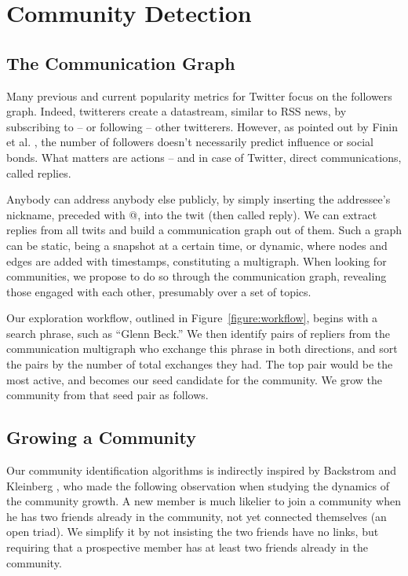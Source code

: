 \section{Community Detection}

\subsection{The Communication Graph}

Many previous and current popularity metrics for Twitter focus on the followers graph.  Indeed, twitterers create a datastream, similar to RSS news, by subscribing to -- or following -- other twitterers.  However, as pointed out by Finin et al. \cite{DBLP:conf/kdd/JavaSFT07}, the number of followers doesn't necessarily predict influence or social bonds.  What matters are actions -- and in case of Twitter, direct communications, called replies.

Anybody can address anybody else publicly, by simply inserting the addressee’s nickname, preceded with @, into the twit (then called reply).  We can extract replies from all twits and build a communication graph out of them.  Such a graph can be static, being a snapshot at a certain time, or dynamic, where nodes and edges are added with timestamps, constituting a multigraph.  When looking for communities, we propose to do so through the communication graph, revealing those engaged with each other, presumably over a set of topics.

Our exploration workflow, outlined in Figure~\ref{figure:workflow}, begins with a search phrase, such as ``Glenn Beck.''  We then identify pairs of repliers from the communication multigraph who exchange this phrase in both directions, and sort the pairs by the number of total exchanges they had.  The top pair would be the most active, and becomes our seed candidate for the community.  We grow the community from that seed pair as follows.

\subsection{Growing a Community}

Our community identification algorithms is indirectly inspired by Backstrom and Kleinberg \cite{DBLP:conf/kdd/BackstromHKL06}, who made the following observation when studying the dynamics of the community growth.  A new member is much likelier to join a community when he has two friends already in the community, not yet connected themselves (an open triad).  We simplify it by not insisting the two friends have no links, but requiring that a prospective member has at least two friends already in the community.


